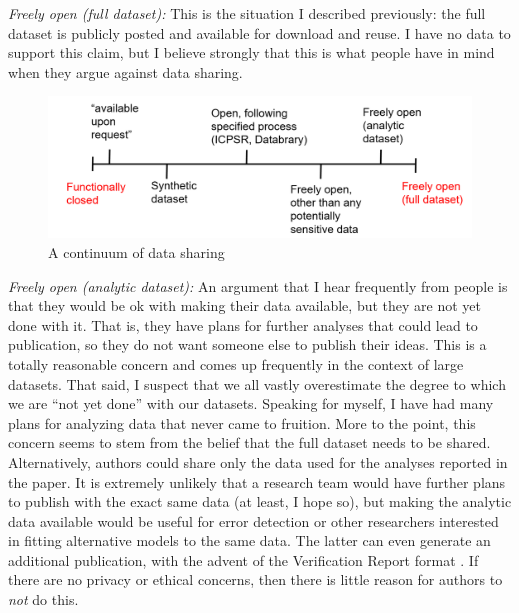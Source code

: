 \documentclass[authordate, empirical]{jote-new-article}
\begin{document}
\emph{Freely open (full dataset): }This is the situation I described previously: the full dataset is publicly posted and available for download and reuse. I have no data to support this claim, but I believe strongly that this is what people have in mind when they argue against data sharing.







\begin{figure}
  \begin{fullwidth}
    \includegraphics[width=\linewidth]{media/image1.png}

    \caption{A continuum of data sharing}

    \label{fig:rId10}

  \end{fullwidth}

\end{figure}










\emph{Freely open (analytic dataset): }An argument that I hear frequently from people is that they would be ok with making their data available, but they are not yet done with it. That is, they have plans for further analyses that could lead to publication, so they do not want someone else to publish their ideas. This is a totally reasonable concern and comes up frequently in the context of large datasets. That said, I suspect that we all vastly overestimate the degree to which we are “not yet done” with our datasets. Speaking for myself, I have had many plans for analyzing data that never came to fruition. More to the point, this concern seems to stem from the belief that the full dataset needs to be shared. Alternatively, authors could share only the data used for the analyses reported in the paper. It is extremely unlikely that a research team would have further plans to publish with the exact same data (at least, I hope so), but making the analytic data available would be useful for error detection or other researchers interested in fitting alternative models to the same data. The latter can even generate an additional publication, with the advent of the Verification Report format \parencites{Chambers2020}. If there are no privacy or ethical concerns, then there is little reason for authors to \emph{not} do this.
\end{document}
